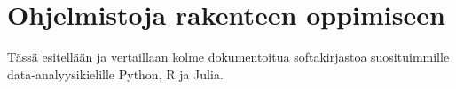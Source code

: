 \chapter{Ohjelmistoja rakenteen oppimiseen\label{software}}
Tässä esitellään ja vertaillaan kolme dokumentoitua softakirjastoa suosituimmille data-analyysikielille Python, R ja Julia.
\citet{scutari_learning_2010}
\citet{atienza_pybnesian_2022}
\citet{bayesnetsjl_2021}